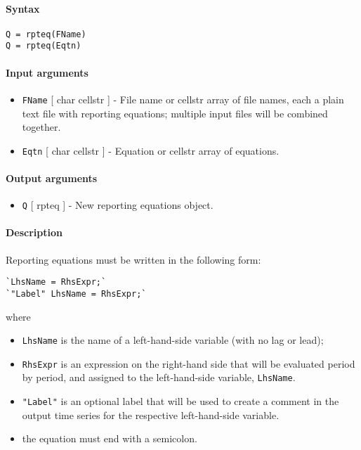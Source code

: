 


	\paragraph{Syntax}

\begin{verbatim}
Q = rpteq(FName)
Q = rpteq(Eqtn)
\end{verbatim}

\paragraph{Input arguments}

\begin{itemize}
\item
  \texttt{FName} {[} char \textbar{} cellstr {]} - File name or cellstr
  array of file names, each a plain text file with reporting equations;
  multiple input files will be combined together.
\item
  \texttt{Eqtn} {[} char \textbar{} cellstr {]} - Equation or cellstr
  array of equations.
\end{itemize}

\paragraph{Output arguments}

\begin{itemize}
\itemsep1pt\parskip0pt
\item
  \texttt{Q} {[} rpteq {]} - New reporting equations object.
\end{itemize}

\paragraph{Description}

Reporting equations must be written in the following form:

\begin{verbatim}
`LhsName = RhsExpr;`
`"Label" LhsName = RhsExpr;`
\end{verbatim}

where

\begin{itemize}
\item
  \texttt{LhsName} is the name of a left-hand-side variable (with no lag
  or lead);
\item
  \texttt{RhsExpr} is an expression on the right-hand side that will be
  evaluated period by period, and assigned to the left-hand-side
  variable, \texttt{LhsName}.
\item
  \texttt{"Label"} is an optional label that will be used to create a
  comment in the output time series for the respective left-hand-side
  variable.
\item
  the equation must end with a semicolon.
\end{itemize}

